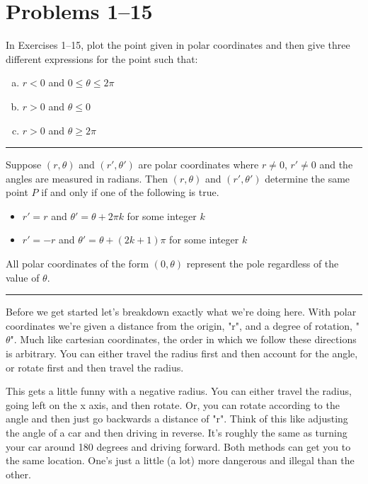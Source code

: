 \section{Problems 1--15}

In Exercises 1--15, plot the point given in polar coordinates and then give three different expressions for the point such that: 
\begin{enumerate}[a)]
    \item $r < 0$ and $0 \leq \theta \leq 2\pi$
    \item $r > 0$ and $\theta \leq 0$
    \item $r > 0$ and $\theta \geq 2\pi$
\end{enumerate}

\hrule \bigskip

\begin{theorem}
    Suppose $(r, \theta)$ and $(r', \theta')$ are polar coordinates where $r \neq 0$, $r' \neq 0$ and the angles are measured in radians. Then $(r, \theta)$ and $(r', \theta')$ determine the same point $P$ if and only if one of the following is true.
    
    \begin{itemize}
        \item $r' = r$ and $\theta' = \theta + 2\pi k$ for some integer $k$ 
        \item $r' = -r$ and $\theta' = \theta + (2k + 1)\pi$ for some integer $k$
    \end{itemize}
    
    All polar coordinates of the form $(0, \theta)$ represent the pole regardless of the value of $\theta$.
\end{theorem} \medskip \hrule \bigskip

    Before we get started let's breakdown exactly what we're doing here. With polar coordinates we're given a distance from the origin, "r", and a degree of rotation, "$\theta$". Much like cartesian coordinates, the order in which we follow these directions is arbitrary. You can either travel the radius first and then account for the angle, or rotate first and then travel the radius. \medskip
    
    This gets a little funny with a negative radius. You can either travel the radius, going left on the x axis, and then rotate. Or, you can rotate according to the angle and then just go backwards a distance of "r". Think of this like adjusting the angle of a car and then driving in reverse. It's roughly the same as turning your car around 180 degrees and driving forward. Both methods can get you to the same location. One's just a little (a lot) more dangerous and illegal than the other. 